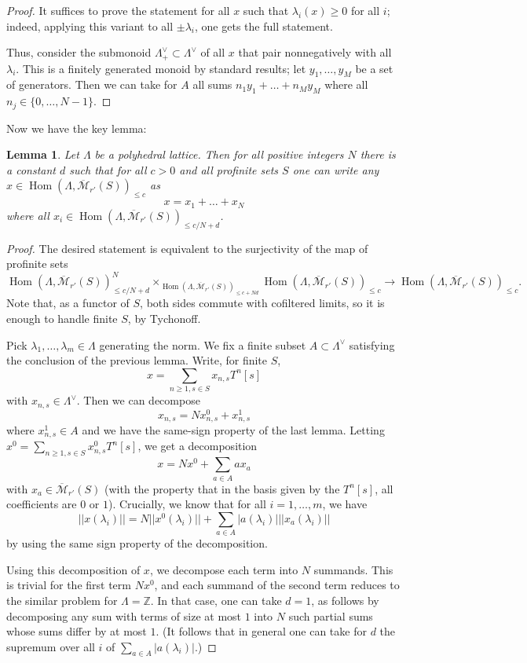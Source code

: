 \documentclass[11pt]{amsbook}
\DeclareMathOperator{\Hom}{Hom}
\numberwithin{equation}{section}
\numberwithin{theorem}{section}
\newtheorem{lemma}[theorem]{Lemma}
\theoremstyle{definition}
\begin{document}
\begin{proof} It suffices to prove the statement for all $x$ such that $\lambda_i(x)\geq 0$ for all $i$; indeed, applying this variant to all $\pm \lambda_i$, one gets the full statement.

Thus, consider the submonoid $\Lambda^\vee_+\subset \Lambda^\vee$ of all $x$ that pair nonnegatively with all $\lambda_i$. This is a finitely generated monoid by standard results; let $y_1,\ldots,y_M$ be a set of generators. Then we can take for $A$ all sums $n_1y_1+\ldots+n_My_M$ where all $n_j\in \{0,\ldots,N-1\}$.
\end{proof}

Now we have the key lemma:

\begin{lemma}\label{lem:key} Let $\Lambda$ be a polyhedral lattice. Then for all positive integers $N$ there is a constant $d$ such that for all $c>0$ and all profinite sets $S$ one can write any $x\in \Hom(\Lambda,\overline{\mathcal M}_{r'}(S))_{\leq c}$ as
\[
x=x_1+\ldots+x_N
\]
where all $x_i\in \Hom(\Lambda,\overline{\mathcal M}_{r'}(S))_{\leq c/N+d}$.
\end{lemma}

\begin{proof} The desired statement is equivalent to the surjectivity of the map of profinite sets
\[
\Hom(\Lambda,\overline{\mathcal M}_{r'}(S))_{\leq c/N+d}^N\times_{\Hom(\Lambda,\overline{\mathcal M}_{r'}(S))_{\leq c+Nd}} \Hom(\Lambda,\overline{\mathcal M}_{r'}(S))_{\leq c}\to \Hom(\Lambda,\overline{\mathcal M}_{r'}(S))_{\leq c}.
\]
Note that, as a functor of $S$, both sides commute with cofiltered limits, so it is enough to handle finite $S$, by Tychonoff.

Pick $\lambda_1,\ldots,\lambda_m\in \Lambda$ generating the norm. We fix a finite subset $A\subset \Lambda^\vee$ satisfying the conclusion of the previous lemma. Write, for finite $S$,
\[
x=\sum_{n\geq 1, s\in S} x_{n,s} T^n [s]
\]
with $x_{n,s}\in \Lambda^\vee$. Then we can decompose
\[
x_{n,s} = N x_{n,s}^0 + x_{n,s}^1
\]
where $x_{n,s}^1\in A$ and we have the same-sign property of the last lemma. Letting $x^0 = \sum_{n\geq 1, s\in S} x_{n,s}^0 T^n [s]$, we get a decomposition
\[
x = Nx^0 + \sum_{a\in A} a x_a
\]
with $x_a\in \overline{\mathcal M}_{r'}(S)$ (with the property that in the
basis given by the $T^n [s]$, all coefficients are $0$ or $1$). Crucially,
we know that for all $i=1,\ldots,m$, we have
\[
||x(\lambda_i)|| = N ||x^0(\lambda_i)|| + \sum_{a\in A} |a(\lambda_i)| ||x_a(\lambda_i)||
\]
by using the same sign property of the decomposition.

Using this decomposition of $x$, we decompose each term into $N$ summands. This is trivial for the first term $Nx^0$, and each summand of the second term reduces to the similar problem for $\Lambda=\mathbb Z$. In that case, one can take $d=1$, as follows by decomposing any sum with terms of size at most $1$ into $N$ such partial sums whose sums differ by at most $1$. (It follows that in general one can take for $d$ the supremum over all $i$ of $\sum_{a\in A} |a(\lambda_i)|$.)
\end{proof}
\end{document}
